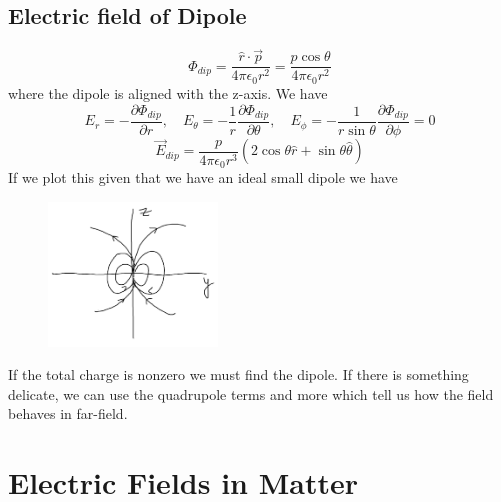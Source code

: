 \section{Electric field of Dipole}
\[
    \Phi_{dip} = \frac{\hat{r} \cdot \vec{p} }{4\pi \epsilon _0 r^{2} } = \frac{p \cos \theta}{4 \pi  \epsilon _0 r^{2} }
\]
where the dipole is aligned with the z-axis. We have 
\[
    E_r = - \frac{\partial \Phi_{dip} }{\partial r}, \quad E_\theta = -\frac{1}{r} \frac{\partial \Phi_{dip} }{\partial \theta}, \quad E_{\phi } = -\frac{1}{r\sin \theta} \frac{\partial \Phi_{dip} }{\partial \phi } = 0    
\]
\[
    \vec{E}_{dip} = \frac{p}{4\pi \epsilon _0 r^{3} } \left(  2 \cos \theta \hat{r} + \sin \theta \hat{\theta}  \right)  
\]
If we plot this given that we have an ideal small dipole we have 
\begin{figure}[H]
    \centering
    \includegraphics[width=0.4\textwidth]{Figures/09.png}
    \caption{}
    \label{fig:}
\end{figure}
If the total charge is nonzero we must find the dipole. If there is something delicate, we can use the quadrupole terms and more which tell us how the field behaves in far-field.

\chapter{Electric Fields in Matter}
